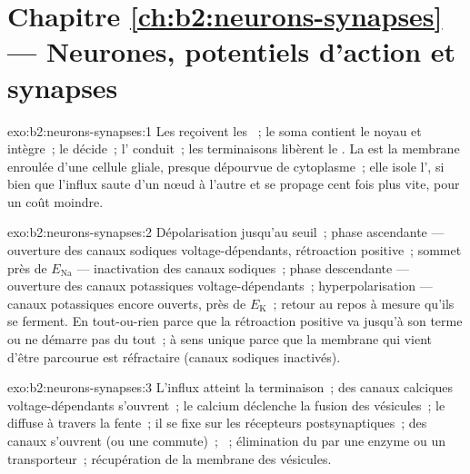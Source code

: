 \section*{Chapitre \ref{ch:b2:neurons-synapses} --- Neurones, potentiels d'action et synapses}

\begin{solution}{exo:b2:neurons-synapses:1}
Les  reçoivent les ~; le soma contient le noyau et
intègre~; le  décide~; l' conduit~; les
terminaisons libèrent le . La  est la membrane
enroulée d'une cellule gliale, presque dépourvue de cytoplasme~; elle
isole l', si bien que l'influx saute d'un nœud à l'autre et se
propage cent fois plus vite, pour un coût moindre.
\end{solution}

\begin{solution}{exo:b2:neurons-synapses:2}
Dépolarisation jusqu'au seuil~; phase ascendante --- ouverture des
canaux sodiques voltage-dépendants, rétroaction positive~; sommet près
de $E_{\mathrm{Na}}$ --- inactivation des canaux sodiques~; phase
descendante --- ouverture des canaux potassiques voltage-dépendants~;
hyperpolarisation --- canaux potassiques encore ouverts, près de
$E_{\mathrm K}$~; retour au repos à mesure qu'ils se ferment. En
tout-ou-rien parce que la rétroaction positive va jusqu'à son terme ou
ne démarre pas du tout~; à sens unique parce que la membrane qui vient
d'être parcourue est réfractaire (canaux sodiques inactivés).
\end{solution}

\begin{solution}{exo:b2:neurons-synapses:3}
L'influx atteint la terminaison~; des canaux calciques voltage-dépendants
s'ouvrent~; le calcium déclenche la fusion des vésicules~; le
 diffuse à travers la fente~; il se fixe sur les
récepteurs postsynaptiques~; des canaux s'ouvrent (ou une 
commute)~; ~; élimination du 
par une enzyme ou un transporteur~; récupération de la membrane des
vésicules.
\end{solution}

